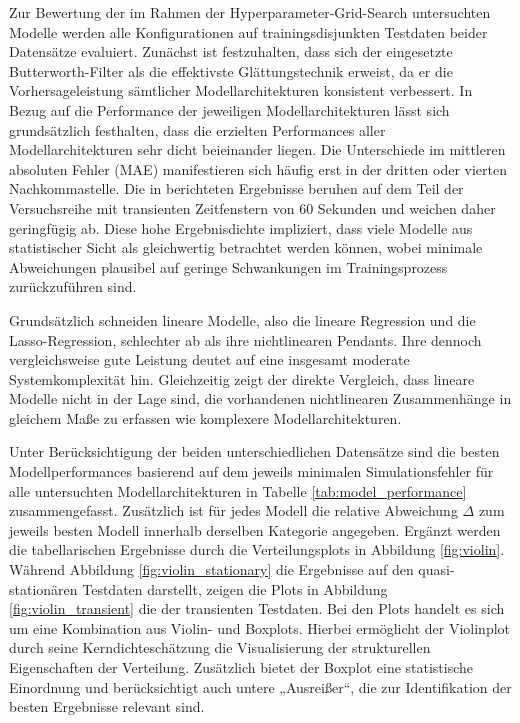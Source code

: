 %
Zur Bewertung der im Rahmen der Hyperparameter-Grid-Search untersuchten Modelle werden alle Konfigurationen auf trainingsdisjunkten Testdaten beider Datensätze evaluiert. Zunächst ist festzuhalten, dass sich der eingesetzte Butterworth-Filter als die effektivste Glättungstechnik erweist, da er die Vorhersageleistung sämtlicher Modellarchitekturen konsistent verbessert. 
In Bezug auf die Performance der jeweiligen Modellarchitekturen lässt sich grundsätzlich festhalten, dass die erzielten Performances aller Modellarchitekturen sehr dicht beieinander liegen. Die Unterschiede im mittleren absoluten Fehler (\ac{MAE}) manifestieren sich häufig erst in der dritten oder vierten Nachkommastelle. Die in \cite{marijan.2026} berichteten Ergebnisse beruhen auf dem Teil der Versuchsreihe mit transienten Zeitfenstern von $60$ Sekunden und weichen daher geringfügig ab. Diese hohe Ergebnisdichte impliziert, dass viele Modelle aus statistischer Sicht als gleichwertig betrachtet werden können, wobei minimale Abweichungen plausibel auf geringe Schwankungen im Trainingsprozess zurückzuführen sind. \par
Grundsätzlich schneiden lineare Modelle, also die lineare Regression und die Lasso-Regression, schlechter ab als ihre nichtlinearen Pendants. Ihre dennoch vergleichsweise gute Leistung deutet auf eine insgesamt moderate Systemkomplexität hin. Gleichzeitig zeigt der direkte Vergleich, dass lineare Modelle nicht in der Lage sind, die vorhandenen nichtlinearen Zusammenhänge in gleichem Maße zu erfassen wie komplexere Modellarchitekturen. \par
Unter Berücksichtigung der beiden unterschiedlichen Datensätze sind die besten Modellperformances basierend auf dem jeweils minimalen Simulationsfehler für alle untersuchten Modellarchitekturen in Tabelle \ref{tab:model_performance} zusammengefasst. Zusätzlich ist für jedes Modell die relative Abweichung $\Delta$ zum jeweils besten Modell innerhalb derselben Kategorie angegeben. Ergänzt werden die tabellarischen Ergebnisse durch die Verteilungsplots in Abbildung \ref{fig:violin}. Während Abbildung \ref{fig:violin_stationary} die Ergebnisse auf den quasi-stationären Testdaten darstellt, zeigen die Plots in Abbildung \ref{fig:violin_transient} die der transienten Testdaten. Bei den Plots handelt es sich um eine Kombination aus Violin- und Boxplots. Hierbei ermöglicht der Violinplot durch seine Kerndichteschätzung die Visualisierung der strukturellen Eigenschaften der Verteilung. Zusätzlich bietet der Boxplot eine statistische Einordnung und berücksichtigt auch untere „Ausreißer“, die zur Identifikation der besten Ergebnisse relevant sind. \par
